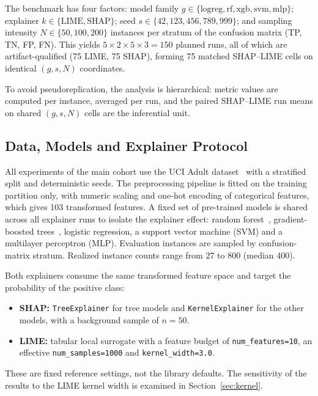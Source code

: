 \documentclass{cleiej}
\begin{document}
The benchmark has four factors: model family
$g \in \{\mathrm{logreg}, \mathrm{rf}, \mathrm{xgb}, \mathrm{svm},
\mathrm{mlp}\}$; explainer $k \in \{\mathrm{LIME}, \mathrm{SHAP}\}$; seed
$s \in \{42, 123, 456, 789, 999\}$; and sampling intensity
$N \in \{50, 100, 200\}$ instances per stratum of the confusion matrix
(TP, TN, FP, FN). This yields $5 \times 2 \times 5 \times 3 = 150$ planned
runs, all of which are artifact-qualified (75 LIME, 75 SHAP), forming 75
matched SHAP--LIME cells on identical $(g, s, N)$ coordinates.

To avoid pseudoreplication, the analysis is hierarchical: metric values are
computed per instance, averaged per run, and the paired SHAP--LIME run
means on shared $(g, s, N)$ cells are the inferential unit.

\subsection{Data, Models and Explainer Protocol}
\label{sec:data}

All experiments of the main cohort use the UCI Adult
dataset~\cite{kohavi1996scaling,becker1996adult} with a stratified split
and deterministic seeds. The preprocessing pipeline is fitted on the
training partition only, with numeric scaling and one-hot encoding of
categorical features, which gives 103 transformed features. A fixed set of
pre-trained models is shared across all explainer runs to isolate the
explainer effect: random forest~\cite{breiman2001random}, gradient-boosted
trees~\cite{chen2016xgboost}, logistic regression, a support vector machine
(SVM) and a multilayer perceptron (MLP). Evaluation instances are sampled
by confusion-matrix stratum. Realized instance counts range from 27 to 800
(median 400).

Both explainers consume the same transformed feature space and target the
probability of the positive class:
\begin{itemize}
\item \textbf{SHAP:} \texttt{TreeExplainer} for tree models and
\texttt{KernelExplainer} for the other models, with a background sample of
$n=50$.
\item \textbf{LIME:} tabular local surrogate with a feature budget of
\texttt{num\_features=10}, an effective \texttt{num\_samples=1000} and
\texttt{kernel\_width=3.0}.
\end{itemize}
\label{sec:explainer_protocol}
These are fixed reference settings, not the library defaults. The
sensitivity of the results to the LIME kernel width is examined in
Section~\ref{sec:kernel}.
\end{document}
